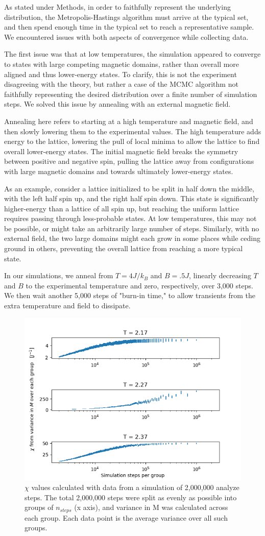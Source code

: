 \documentclass[letter,scriptaddress,twocolumn, prl,nofootinbib]{revtex4}
\begin{document}
As stated under Methods, in order to faithfully represent the underlying distribution, the Metropolis-Hastings algorithm must arrive at the typical set, and then spend enough time in the typical set to reach a representative sample. We encountered issues with both aspects of convergence while collecting data.

The first issue was that at low temperatures, the simulation appeared to converge to states with large competing magnetic domains, rather than overall more aligned and thus lower-energy states. To clarify, this is not the experiment disagreeing with the theory, but rather a case of the MCMC algorithm not faithfully representing the desired distribution over a finite number of simulation steps. We solved this issue by annealing with an external magnetic field.

Annealing here refers to starting at a high temperature and magnetic field, and then slowly lowering them to the experimental values. The high temperature adds energy to the lattice, lowering the pull of local minima to allow the lattice to find overall lower-energy states. The initial magnetic field breaks the symmetry between positive and negative spin, pulling the lattice away from configurations with large magnetic domains and towards ultimately lower-energy states. 

As an example, consider a lattice initialized to be split in half down the middle, with the left half spin up, and the right half spin down. This state is significantly higher-energy than a lattice of all spin up, but reaching the uniform lattice requires passing through less-probable states. At low temperatures, this may not be possible, or might take an arbitrarily large number of steps. Similarly, with no external field, the two large domains might each grow in some places while ceding ground in others, preventing the overall lattice from reaching a more typical state.

In our simulations, we anneal from $T = 4 J/k_B$ and $B = .5 J$, linearly decreasing $T$ and $B$ to the experimental temperature and zero, respectively, over 3,000 steps. We then wait another 5,000 steps of "burn-in time," to allow transients from the extra temperature and field to dissipate.

\begin{figure}[h]
	\begin{center}
		\includegraphics[width=.4\textwidth]{figs/figA1.png}
		\caption{$\chi$ values calculated with data from a simulation of 2,000,000 analyze steps. The total 2,000,000 steps were split as evenly as possible into groups of $n_{steps}$ (x axis), and variance in M was calculated across each group. Each data point is the average variance over all such groups.}
		\label{fig:figA1}
	\end{center}
\end{figure}
\end{document}
